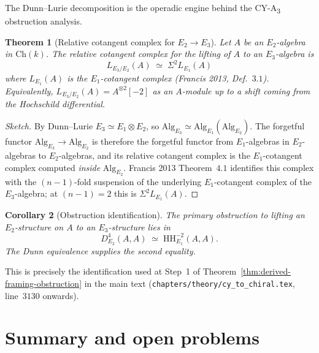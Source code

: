\documentclass[11pt]{article}
\newtheorem{theorem}{Theorem}[section]
\newtheorem{corollary}[theorem]{Corollary}
\newcommand{\Eone}{E_{1}}
\newcommand{\Etwo}{E_{2}}
\newcommand{\Ethree}{E_{3}}
\newcommand{\Alg}{\mathrm{Alg}}
\newcommand{\HH}{\mathrm{HH}}
\begin{document}
The Dunn--Lurie decomposition is the operadic engine behind the CY-A\textsubscript{3}
obstruction analysis.

\begin{theorem}[Relative cotangent complex for $\Etwo \to \Ethree$]
\label{thm:relative-cotangent}
Let $A$ be an $\Etwo$-algebra in $\mathrm{Ch}(k)$. The relative cotangent
complex for the lifting of $A$ to an $\Ethree$-algebra is
\[
  L_{\Ethree/\Etwo}(A) \;\simeq\; \Sigma^{2} L_{\Eone}(A)
\]
where $L_{\Eone}(A)$ is the $\Eone$-cotangent complex (Francis 2013,
Def.~$3.1$). Equivalently, $L_{\Ethree/\Etwo}(A) = A^{\otimes 2}[-2]$ as
an $A$-module up to a shift coming from the Hochschild differential.
\end{theorem}

\begin{proof}[Sketch]
By Dunn--Lurie $\Ethree \simeq \Eone \otimes \Etwo$, so
$\Alg_{\Ethree} \simeq \Alg_{\Eone}(\Alg_{\Etwo})$. The forgetful functor
$\Alg_{\Ethree} \to \Alg_{\Etwo}$ is therefore the forgetful functor
from $\Eone$-algebras in $\Etwo$-algebras to $\Etwo$-algebras, and its
relative cotangent complex is the $\Eone$-cotangent complex computed
\emph{inside} $\Alg_{\Etwo}$. Francis 2013 Theorem~$4.1$ identifies this
complex with the $(n - 1)$-fold suspension of the underlying
$\Eone$-cotangent complex of the $\Ethree$-algebra; at $(n - 1) = 2$
this is $\Sigma^{2} L_{\Eone}(A)$.
\end{proof}

\begin{corollary}[Obstruction identification]
\label{cor:obstruction-identification}
The primary obstruction to lifting an $\Etwo$-structure on $A$ to an
$\Ethree$-structure lies in
\[
  D^{4}_{\Etwo}(A, A) \;\simeq\; \HH^{-2}_{\Eone}(A, A).
\]
The Dunn equivalence supplies the second equality.
\end{corollary}

This is precisely the identification used at Step~1 of
Theorem~\ref{thm:derived-framing-obstruction} in the main text
(\texttt{chapters/theory/cy\_to\_chiral.tex}, line~$3130$ onwards).

\section{Summary and open problems}
\label{sec:summary}
\end{document}
